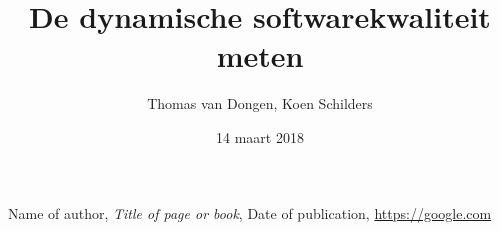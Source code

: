 \documentclass[12pt]{article}
\title{De dynamische softwarekwaliteit meten}
\author{Thomas van Dongen, Koen Schilders}
\date{14 maart 2018}
\begin{document}
\begin{titlepage}
\maketitle
\end{titlepage}

\begin{thebibliography}{9}
	Name of author,
	\textit{Title of page or book},
	Date of publication,
	\url{https://google.com}
\end{thebibliography}
\end{document}
